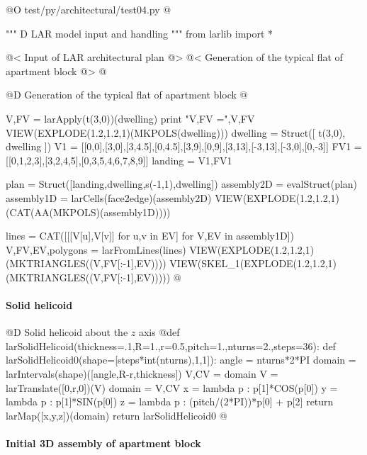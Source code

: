 \documentclass[11pt,oneside]{article}    %
\begin{document}
@O test/py/architectural/test04.py
@{""" D LAR model input and handling """
from larlib import *

@< Input of LAR architectural plan @>
@< Generation of the typical flat of apartment block @>
@}

@D Generation of the typical flat of apartment block
@{V,FV = larApply(t(3,0))(dwelling)
print "\n V,FV =",V,FV
VIEW(EXPLODE(1.2,1.2,1)(MKPOLS(dwelling)))
dwelling = Struct([ t(3,0), dwelling ])
V1 = [[0,0],[3,0],[3,4.5],[0,4.5],[3,9],[0,9],[3,13],[-3,13],[-3,0],[0,-3]]
FV1 = [[0,1,2,3],[3,2,4,5],[0,3,5,4,6,7,8,9]]
landing = V1,FV1

plan = Struct([landing,dwelling,s(-1,1),dwelling])
assembly2D = evalStruct(plan)
assembly1D = larCells(face2edge)(assembly2D)
VIEW(EXPLODE(1.2,1.2,1)(CAT(AA(MKPOLS)(assembly1D))))

lines = CAT([[[V[u],V[v]] for u,v in EV] for V,EV in assembly1D])
V,FV,EV,polygons = larFromLines(lines)
VIEW(EXPLODE(1.2,1.2,1)(MKTRIANGLES((V,FV[:-1],EV))))
VIEW(SKEL_1(EXPLODE(1.2,1.2,1)(MKTRIANGLES((V,FV[:-1],EV)))))
@}



\paragraph{Solid helicoid}
@D Solid helicoid about the $z$ axis
@{def larSolidHelicoid(thickness=.1,R=1.,r=0.5,pitch=1.,nturns=2.,steps=36):
	def larSolidHelicoid0(shape=[steps*int(nturns),1,1]):
		angle = nturns*2*PI
		domain = larIntervals(shape)([angle,R-r,thickness])
		V,CV = domain
		V = larTranslate([0,r,0])(V)
		domain = V,CV
		x = lambda p : p[1]*COS(p[0])
		y = lambda p : p[1]*SIN(p[0])
		z = lambda p : (pitch/(2*PI))*p[0] + p[2]
		return larMap([x,y,z])(domain)
	return larSolidHelicoid0
@}


\paragraph{Initial 3D assembly of apartment block}
\end{document}
